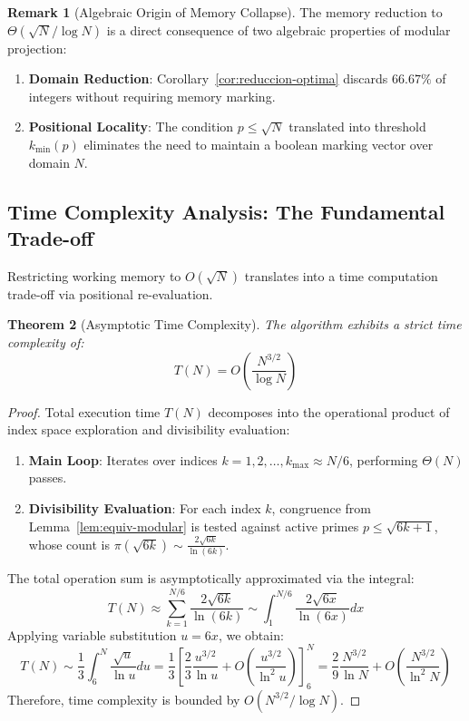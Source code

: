 \documentclass{article}
\numberwithin{equation}{section}
\theoremstyle{plain}
\newtheorem{theorem}{Theorem}[section]
\theoremstyle{definition}
\newtheorem{remark}[theorem]{Remark}
\begin{document}
\begin{remark}[Algebraic Origin of Memory Collapse]
The memory reduction to $\Theta(\sqrt{N}/\log N)$ is a direct consequence of two algebraic properties of modular projection:
\begin{enumerate}
    \item \textbf{Domain Reduction}: Corollary~\ref{cor:reduccion-optima} discards $66.67\%$ of integers without requiring memory marking.
    \item \textbf{Positional Locality}: The condition $p \le \sqrt{N}$ translated into threshold $k_{\min}(p)$ eliminates the need to maintain a boolean marking vector over domain $N$.
\end{enumerate}
\end{remark}

\subsection{Time Complexity Analysis: The Fundamental Trade-off}

Restricting working memory to $O(\sqrt{N})$ translates into a time computation trade-off via positional re-evaluation.

\begin{theorem}[Asymptotic Time Complexity]
\label{thm:complejidad-temporal}
The algorithm exhibits a strict time complexity of:
\begin{equation}
T(N) = O\left(\frac{N^{3/2}}{\log N}\right)
\end{equation}
\end{theorem}

\begin{proof}
Total execution time $T(N)$ decomposes into the operational product of index space exploration and divisibility evaluation:
\begin{enumerate}
    \item \textbf{Main Loop}: Iterates over indices $k = 1, 2, \dots, k_{\max} \approx N/6$, performing $\Theta(N)$ passes.
    \item \textbf{Divisibility Evaluation}: For each index $k$, congruence from Lemma~\ref{lem:equiv-modular} is tested against active primes $p \le \sqrt{6k+1}$, whose count is $\pi(\sqrt{6k}) \sim \frac{2\sqrt{6k}}{\ln(6k)}$.
\end{enumerate}
The total operation sum is asymptotically approximated via the integral:
\begin{equation}
T(N) \approx \sum_{k=1}^{N/6} \frac{2\sqrt{6k}}{\ln(6k)} \sim \int_{1}^{N/6} \frac{2\sqrt{6x}}{\ln(6x)} dx
\end{equation}
Applying variable substitution $u = 6x$, we obtain:
\begin{equation}
T(N) \sim \frac{1}{3} \int_{6}^{N} \frac{\sqrt{u}}{\ln u} du = \frac{1}{3} \left[ \frac{2}{3} \frac{u^{3/2}}{\ln u} + O\left(\frac{u^{3/2}}{\ln^2 u}\right) \right]_{6}^{N} = \frac{2}{9} \frac{N^{3/2}}{\ln N} + O\left(\frac{N^{3/2}}{\ln^2 N}\right)
\end{equation}
Therefore, time complexity is bounded by $O(N^{3/2}/\log N)$.
\end{proof}
\end{document}

